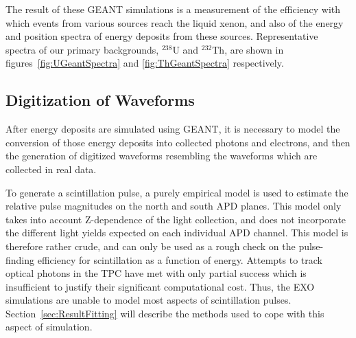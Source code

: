 The result of these GEANT simulations is a measurement of the efficiency with which events from various sources reach the liquid xenon, and also of the energy and position spectra of energy deposits from these sources.  Representative spectra of our primary backgrounds, $^{238}$U and $^{232}$Th, are shown in figures~\ref{fig:UGeantSpectra} and \ref{fig:ThGeantSpectra} respectively.

\subsection{Digitization of Waveforms}\label{sec:ResultsDigitization}

After energy deposits are simulated using GEANT, it is necessary to model the conversion of those energy deposits into collected photons and electrons, and then the generation of digitized waveforms resembling the waveforms which are collected in real data.

To generate a scintillation pulse, a purely empirical model is used to estimate the relative pulse magnitudes on the north and south APD planes.  This model only takes into account Z-dependence of the light collection, and does not incorporate the different light yields expected on each individual APD channel.  This model is therefore rather crude, and can only be used as a rough check on the pulse-finding efficiency for scintillation as a function of energy.  Attempts to track optical photons in the TPC have met with only partial success which is insufficient to justify their significant computational cost.  Thus, the EXO simulations are unable to model most aspects of scintillation pulses.  Section~\ref{sec:ResultFitting} will describe the methods used to cope with this aspect of simulation.

